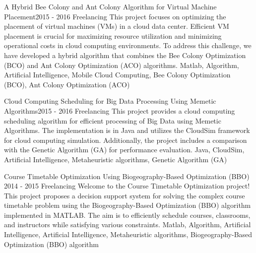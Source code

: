 \begin{projects}
	\project
	{A Hybrid Bee Colony and Ant Colony Algorithm for Virtual Machine Placement}{2015 - 2016}
	{ {Freelancing} }
	{This project focuses on optimizing the placement of virtual machines (VMs) in a cloud data center. Efficient VM placement is crucial for maximizing resource utilization and minimizing operational costs in cloud computing environments. To address this challenge, we have developed a hybrid algorithm that combines the Bee Colony Optimization (BCO) and Ant Colony Optimization (ACO) algorithms.}
	{Matlab, Algorithm, Artificial Intelligence, Mobile Cloud Computing, Bee Colony Optimization (BCO), Ant Colony Optimization (ACO)}

	\project
	{Cloud Computing Scheduling for Big Data Processing Using Memetic Algorithms}{2015 - 2016}
	{ {Freelancing} }
	{This project provides a cloud computing scheduling algorithm for efficient processing of Big Data using Memetic Algorithms. The implementation is in Java and utilizes the CloudSim framework for cloud computing simulation. Additionally, the project includes a comparison with the Genetic Algorithm (GA) for performance evaluation.}
	{Java, CloudSim, Artificial Intelligence, Metaheuristic algorithms, Genetic Algorithm (GA)}

	\project
	{Course Timetable Optimization Using Biogeography-Based Optimization (BBO) }{2014 - 2015}
	{ {Freelancing} }
	{Welcome to the Course Timetable Optimization project! This project proposes a decision support system for solving the complex course timetable problem using the Biogeography-Based Optimization (BBO) algorithm implemented in MATLAB. The aim is to efficiently schedule courses, classrooms, and instructors while satisfying various constraints.}
	{Matlab, Algorithm, Artificial Intelligence, Artificial Intelligence, Metaheuristic algorithms, Biogeography-Based Optimization (BBO) algorithm}

\end{projects}
